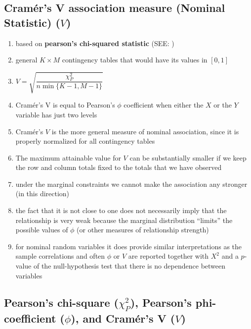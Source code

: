 \subsection{Cramér’s V association measure (Nominal Statistic) ($V$) \cite{ism-1}} \label{Multivariate Distributions: Cramer’s V association measure (Nominal Statistic)}


\begin{enumerate}
    \item based on \textbf{pearson’s chi-squared statistic} (SEE: )

    \item general $K \times  M$ contingency tables that would have its values in $[0, 1]$

    \item $
        V = \sqrt{\dfrac{\chi_P^2}{
        n\min\{K-1,M-1\}
        }}
    $

    \item Cramér’s V is equal to Pearson’s $\phi$ coefficient when either the $X$ or the $Y$ variable has just two levels

    \item Cramér’s $V$ is the more general measure of nominal association, since it is properly normalized for all contingency tables

    \item The maximum attainable value for $V$ can be substantially smaller if we keep the row and column totals fixed to the totals that we have observed

    \item under the marginal constraints we cannot make the association any stronger (in this direction)

    \item the fact that it is not close to one does not necessarily imply that the relationship is very weak because the marginal distribution “limits” the possible values of $\phi$ (or other measures of relationship strength)

    \item for nominal random variables it does provide similar interpretations as the sample correlations and often $\phi$ or $V$ are reported together with $X^2$ and a $p$-value of the null-hypothesis test that there is no dependence between variables
\end{enumerate}


\subsection{Pearson’s chi-square ($\chi_P^2$), Pearson’s phi-coefficient ($\phi$), and Cramér’s V ($V$) \cite{ism-1}} \label{Multivariate Distributions: Pearson’s chi-square, Pearson’s phi-coefficient, and Cramér’s V}

